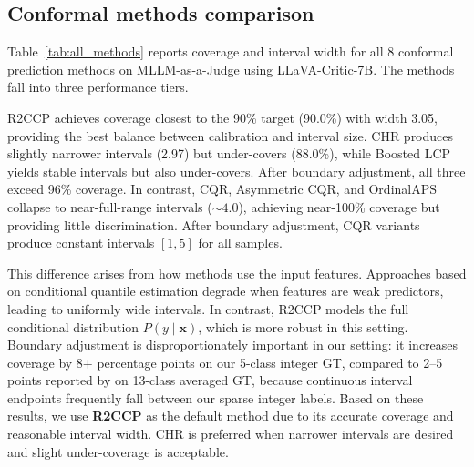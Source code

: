 \documentclass{article}
\begin{document}
\subsection{Conformal methods comparison}
\label{sec:methods_comparison}

Table~\ref{tab:all_methods} reports coverage and interval width for all 8 conformal prediction methods on MLLM-as-a-Judge using LLaVA-Critic-7B. The methods fall into three performance tiers.

R2CCP achieves coverage closest to the 90\% target (90.0\%) with width 3.05, providing the best balance between calibration and interval size. CHR produces slightly narrower intervals (2.97) but under-covers (88.0\%), while Boosted LCP yields stable intervals but also under-covers. After boundary adjustment, all three exceed 96\% coverage. In contrast, CQR, Asymmetric CQR, and OrdinalAPS collapse to near-full-range intervals (${\sim}4.0$), achieving near-100\% coverage but providing little discrimination. After boundary adjustment, CQR variants produce constant intervals $[1,5]$ for all samples.

This difference arises from how methods use the input features. Approaches based on conditional quantile estimation degrade when features are weak predictors, leading to uniformly wide intervals. In contrast, R2CCP models the full conditional distribution $P(y \mid \mathbf{x})$, which is more robust in this setting. Boundary adjustment is disproportionately important in our setting: it increases coverage by 8+ percentage points on our 5-class integer GT, compared to 2--5 points reported by \citet{sheng2025analyzing} on 13-class averaged GT, because continuous interval endpoints frequently fall between our sparse integer labels. Based on these results, we use \textbf{R2CCP} as the default method due to its accurate coverage and reasonable interval width. CHR is preferred when narrower intervals are desired and slight under-coverage is acceptable.
\end{document}
